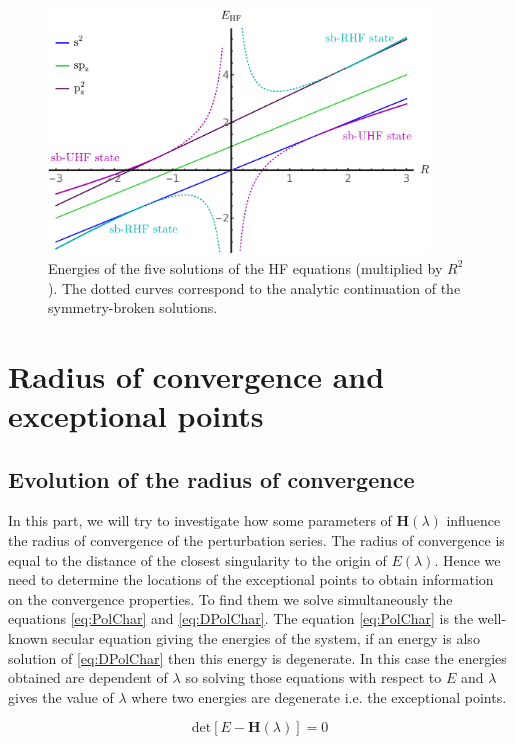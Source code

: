 \documentclass[11pt,a4paper]{article}
\newcommand{\bH}{\mathbf{H}}
\begin{document}
\begin{figure}[h!]
    \centering
    \includegraphics[width=0.9\textwidth]{EsbHF.pdf}
    \caption{\centering Energies of the five solutions of the HF equations (multiplied by $R^2$). The dotted curves correspond to the analytic continuation of the symmetry-broken solutions.}
    \label{fig:SpheriumNrj}
\end{figure}

\section{Radius of convergence and exceptional points}

\subsection{Evolution of the radius of convergence}

In this part, we will try to investigate how some parameters of $\bH(\lambda)$ influence the radius of convergence of the perturbation series. The radius of convergence is equal to the distance of the closest singularity to the origin of $E(\lambda)$. Hence we need to determine the locations of the exceptional points to obtain information on the convergence properties. To find them we solve simultaneously the equations \eqref{eq:PolChar} and \eqref{eq:DPolChar}. The equation \eqref{eq:PolChar} is the well-known secular equation giving the energies of the system, if an energy is also solution of \eqref{eq:DPolChar} then this energy is degenerate. In this case the energies obtained are dependent of $\lambda$ so solving those equations with respect to $E$ and $\lambda$ gives the value of $\lambda$ where two energies are degenerate i.e. the exceptional points.

\begin{equation}\label{eq:PolChar}
\text{det}[E-\bH(\lambda)]=0
\end{equation}
\end{document}
